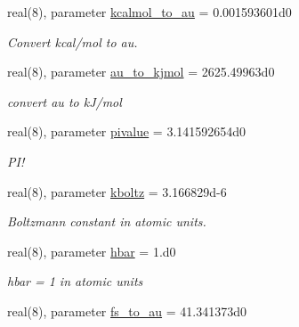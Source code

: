 \begin{DoxyCompactItemize}
real(8), parameter \mbox{\hyperlink{namespaceconstants_a65d52d0f0ed8afc2c85db912d19d598c}{kcalmol\+\_\+to\+\_\+au}} = 0.\+001593601d0
\begin{DoxyCompactList}\small\item\em Convert kcal/mol to au. \end{DoxyCompactList}\item 
\mbox{\label{namespaceconstants_a28675d67e6ec148d36d4838c6a17c167}} 
real(8), parameter \mbox{\hyperlink{namespaceconstants_a28675d67e6ec148d36d4838c6a17c167}{au\+\_\+to\+\_\+kjmol}} = 2625.\+49963d0
\begin{DoxyCompactList}\small\item\em convert au to k\+J/mol \end{DoxyCompactList}\item 
\mbox{\label{namespaceconstants_aec038c64fa7685912341ec49d487a8e0}} 
real(8), parameter \mbox{\hyperlink{namespaceconstants_aec038c64fa7685912341ec49d487a8e0}{pivalue}} = 3.\+141592654d0
\begin{DoxyCompactList}\small\item\em P\+I! \end{DoxyCompactList}\item 
\mbox{\label{namespaceconstants_a8bb6ea0710883e5cb54a3acf4d8bba4a}} 
real(8), parameter \mbox{\hyperlink{namespaceconstants_a8bb6ea0710883e5cb54a3acf4d8bba4a}{kboltz}} = 3.\+166829d-\/6
\begin{DoxyCompactList}\small\item\em Boltzmann constant in atomic units. \end{DoxyCompactList}\item 
\mbox{\label{namespaceconstants_a53b4e27048dc66bd135ee665385c8097}} 
real(8), parameter \mbox{\hyperlink{namespaceconstants_a53b4e27048dc66bd135ee665385c8097}{hbar}} = 1.d0
\begin{DoxyCompactList}\small\item\em hbar = 1 in atomic units \end{DoxyCompactList}\item 
\mbox{\label{namespaceconstants_a0a1ccb19e83b6795ef6805ed2a0a38fb}} 
real(8), parameter \mbox{\hyperlink{namespaceconstants_a0a1ccb19e83b6795ef6805ed2a0a38fb}{fs\+\_\+to\+\_\+au}} = 41.\+341373d0

\end{DoxyCompactItemize}
